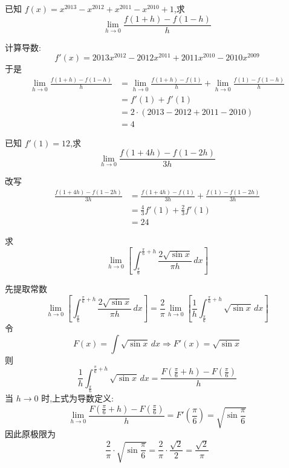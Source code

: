 \begin{questions}
    \question 已知 $f(x) = x^{2013} - x^{2012} + x^{2011} - x^{2010} + 1$,求 
    \[
    \lim_{h \to 0} \frac{f(1+h) - f(1-h)}{h}
    \]
    \begin{solution}
        计算导数:
        \[ 
        f'(x) = 2013x^{2012} - 2012x^{2011} + 2011x^{2010} - 2010x^{2009} 
        \]
        于是
        \begin{align*}
        \lim_{h \to 0} \frac{f(1+h) - f(1-h)}{h} 
        &= \lim_{h \to 0} \frac{f(1+h) - f(1)}{h} + \lim_{h \to 0} \frac{f(1) - f(1-h)}{h} \\
        &= f'(1) + f'(1) \\
        &= 2 \cdot (2013-2012+2011-2010) \\
        &= 4
        \end{align*}
    \end{solution}

    \question 已知 \( f'(1) = 12 \),求
    \[
    \lim_{h \to 0} \frac{f(1 + 4h) - f(1 - 2h)}{3h}
    \]
    \begin{solution}
        改写
        \begin{align*}
        \frac{f(1 + 4h) - f(1 - 2h)}{3h}
        &= \frac{f(1 + 4h) - f(1)}{3h} + \frac{f(1) - f(1 - 2h)}{3h} \\
        &= \frac{4}{3} f'(1) + \frac{2}{3} f'(1) \\
        &= 24
        \end{align*}
    \end{solution}

    \question 求
    \[
    \lim_{h \to 0} \left[ \int_{\frac{\pi}{6}}^{\frac{\pi}{6}+h} \frac{2\sqrt{\sin x}}{\pi h} \, dx \right]
    \]
    \begin{solution}
        先提取常数
        \[
        \lim_{h \to 0} \left[ \int_{\frac{\pi}{6}}^{\frac{\pi}{6}+h} \frac{2\sqrt{\sin x}}{\pi h} \, dx \right] 
        = \frac{2}{\pi} \lim_{h \to 0} \left[ \frac{1}{h} \int_{\frac{\pi}{6}}^{\frac{\pi}{6}+h} \sqrt{\sin x} \, dx \right]
        \]
        令
        \[
        F(x) = \int \sqrt{\sin x} \, dx \Rightarrow F'(x) = \sqrt{\sin x}
        \]
        则
        \[
        \frac{1}{h} \int_{\frac{\pi}{6}}^{\frac{\pi}{6}+h} \sqrt{\sin x} \, dx = \frac{F\left(\frac{\pi}{6}+h\right) - F\left(\frac{\pi}{6}\right)}{h}
        \]
        当 \(h \to 0\) 时,上式为导数定义:
        \[
        \lim_{h \to 0} \frac{F\left(\frac{\pi}{6}+h\right) - F\left(\frac{\pi}{6}\right)}{h} = F'\left(\frac{\pi}{6}\right) = \sqrt{\sin \frac{\pi}{6}}
        \]
        因此原极限为
        \[
        \frac{2}{\pi} \cdot \sqrt{\sin \frac{\pi}{6}} = \frac{2}{\pi} \cdot \frac{\sqrt{2}}{2} = \frac{\sqrt{2}}{\pi}
        \]
    \end{solution}


\end{questions}
